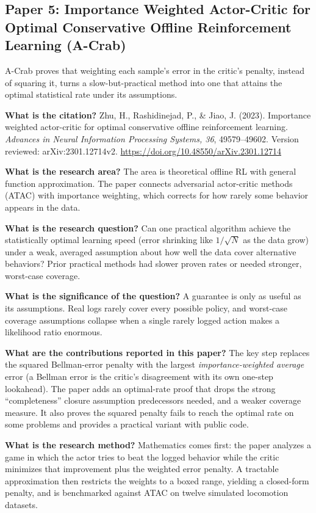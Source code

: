 \documentclass[11pt]{article}
\newcommand{\paper}[1]{\subsection*{#1}}
\newcommand{\q}[2]{\item \textbf{#1} #2}
\begin{document}
\paper{Paper 5: Importance Weighted Actor-Critic for Optimal Conservative Offline Reinforcement Learning (A-Crab)}
A-Crab proves that weighting each sample's error in the critic's penalty, instead of squaring it, turns a slow-but-practical method into one that attains the optimal statistical rate under its assumptions.
\begin{qna}

\q{What is the citation?}
Zhu, H., Rashidinejad, P., \& Jiao, J. (2023). Importance weighted actor-critic for optimal conservative offline reinforcement learning. \emph{Advances in Neural Information Processing Systems, 36}, 49579--49602. Version reviewed: arXiv:2301.12714v2. \url{https://doi.org/10.48550/arXiv.2301.12714}

\q{What is the research area?}
The area is theoretical offline RL with general function approximation. The paper connects adversarial actor-critic methods (ATAC) with importance weighting, which corrects for how rarely some behavior appears in the data.

\q{What is the research question?}
Can one practical algorithm achieve the statistically optimal learning speed (error shrinking like $1/\sqrt{N}$ as the data grow) under a weak, averaged assumption about how well the data cover alternative behaviors? Prior practical methods had slower proven rates or needed stronger, worst-case coverage.

\q{What is the significance of the question?}
A guarantee is only as useful as its assumptions. Real logs rarely cover every possible policy, and worst-case coverage assumptions collapse when a single rarely logged action makes a likelihood ratio enormous.

\q{What are the contributions reported in this paper?}
The key step replaces the squared Bellman-error penalty with the largest \emph{importance-weighted average} error (a Bellman error is the critic's disagreement with its own one-step lookahead). The paper adds an optimal-rate proof that drops the strong ``completeness'' closure assumption predecessors needed, and a weaker coverage measure. It also proves the squared penalty fails to reach the optimal rate on some problems and provides a practical variant with public code.

\q{What is the research method?}
Mathematics comes first: the paper analyzes a game in which the actor tries to beat the logged behavior while the critic minimizes that improvement plus the weighted error penalty. A tractable approximation then restricts the weights to a boxed range, yielding a closed-form penalty, and is benchmarked against ATAC on twelve simulated locomotion datasets.


\end{qna}
\end{document}
